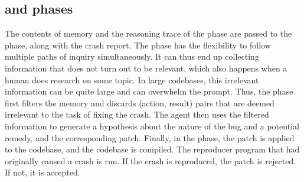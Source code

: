 \subsection{\synthesisphase and \validationphase phases}
\label{sec:synth}

The contents of memory and the reasoning trace of the \analysisphase phase are passed to the \synthesisphase phase, along with the crash report. The \analysisphase phase has the flexibility to follow multiple paths of inquiry simultaneously. It can thus end up collecting information that does not turn out to be relevant, which also happens when a human does research on some topic.
In large codebases, this irrelevant information can be quite large and can overwhelm the prompt.
Thus, the \synthesisphase phase first filters the memory and discards (action, result) pairs that are deemed irrelevant to the task of fixing the crash. The agent then uses the filtered information to generate a hypothesis about the nature of the bug and a potential remedy, and the corresponding patch. Finally, in the \validationphase phase, the patch is applied to the codebase, and the codebase is compiled. The reproducer program that had originally caused a crash is run. If the crash is reproduced, the patch is rejected. If not, it is accepted.
